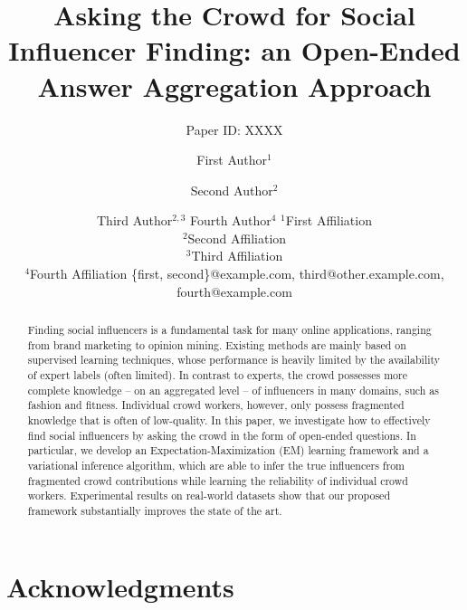 \documentclass{article}
\title{Asking the Crowd for Social Influencer Finding: an Open-Ended Answer Aggregation Approach}
\author{
Paper ID: XXXX
}
\author{
First Author$^1$
\and
Second Author$^2$\and
Third Author$^{2,3}$\And
Fourth Author$^4$
\affiliations
$^1$First Affiliation\\
$^2$Second Affiliation\\
$^3$Third Affiliation\\
$^4$Fourth Affiliation
\emails
\{first, second\}@example.com,
third@other.example.com,
fourth@example.com
}
\begin{document}
\maketitle

\begin{abstract}
Finding social influencers is a fundamental task for many online applications, ranging from brand
marketing to opinion mining. Existing methods are mainly based on supervised learning techniques,
whose performance is heavily limited by the availability of expert labels (often limited). In
contrast to experts, the crowd possesses more complete knowledge -- on an aggregated level -- of
influencers in many domains, such as fashion and fitness. Individual crowd workers, however, only
possess fragmented knowledge that is often of low-quality. In this paper, we investigate how to
effectively find social influencers by asking the crowd in the form of open-ended questions. In
particular, we develop an Expectation-Maximization (EM) learning framework and a variational
inference algorithm, which are able to infer the true influencers from fragmented crowd
contributions while learning the reliability of individual crowd workers. Experimental results on
real-world datasets show that our proposed framework substantially improves the state of the art.
\end{abstract}





\label{sec:intro}


\label{sec:related}


\label{sec:method}


\label{sec:result}


\label{sec:conclusion}




\section*{Acknowledgments}





\end{document}
